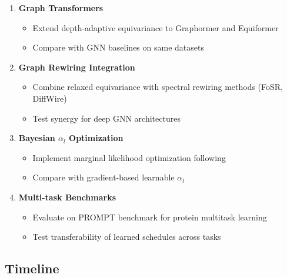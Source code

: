 \documentclass[11pt,a4paper]{article}
\begin{document}
\begin{enumerate}
    \item \textbf{Graph Transformers}
    \begin{itemize}
        \item Extend depth-adaptive equivariance to Graphormer \cite{ying2021graphormer} and Equiformer \cite{liao2023equiformer}
        \item Compare with GNN baselines on same datasets
    \end{itemize}
    
    \item \textbf{Graph Rewiring Integration}
    \begin{itemize}
        \item Combine relaxed equivariance with spectral rewiring methods (FoSR, DiffWire)
        \item Test synergy for deep GNN architectures
    \end{itemize}
    
    \item \textbf{Bayesian $\alpha_l$ Optimization}
    \begin{itemize}
        \item Implement marginal likelihood optimization following \cite{vanderouderaa2023layerwise}
        \item Compare with gradient-based learnable $\alpha_l$
    \end{itemize}
    
    \item \textbf{Multi-task Benchmarks}
    \begin{itemize}
        \item Evaluate on PROMPT benchmark for protein multitask learning
        \item Test transferability of learned schedules across tasks
    \end{itemize}
\end{enumerate}

\subsection{Timeline}
\end{document}
